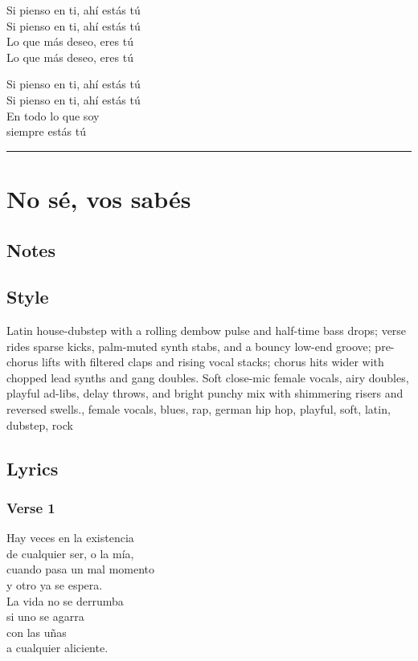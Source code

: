 \documentclass[]{article}
\begin{document}
Si pienso en ti, ahí estás tú\\
Si pienso en ti, ahí estás tú\\
Lo que más deseo, eres tú\\
Lo que más deseo, eres tú

Si pienso en ti, ahí estás tú\\
Si pienso en ti, ahí estás tú\\
En todo lo que soy\\
siempre estás tú

\begin{center}\rule{0.5\linewidth}{0.5pt}\end{center}

\section{No sé, vos sabés}\label{no-suxe9-vos-sabuxe9s}

\subsection{Notes}\label{notes-28}

\subsection{Style}\label{style-28}

Latin house-dubstep with a rolling dembow pulse and half-time bass
drops; verse rides sparse kicks, palm-muted synth stabs, and a bouncy
low-end groove; pre-chorus lifts with filtered claps and rising vocal
stacks; chorus hits wider with chopped lead synths and gang doubles.
Soft close-mic female vocals, airy doubles, playful ad-libs, delay
throws, and bright punchy mix with shimmering risers and reversed
swells., female vocals, blues, rap, german hip hop, playful, soft,
latin, dubstep, rock

\subsection{Lyrics}\label{lyrics-28}

\subsubsection{Verse 1}\label{verse-1-19}

Hay veces en la existencia\\
de cualquier ser, o la mía,\\
cuando pasa un mal momento\\
y otro ya se espera.\\
La vida no se derrumba\\
si uno se agarra\\
con las uñas\\
a cualquier aliciente.
\end{document}
